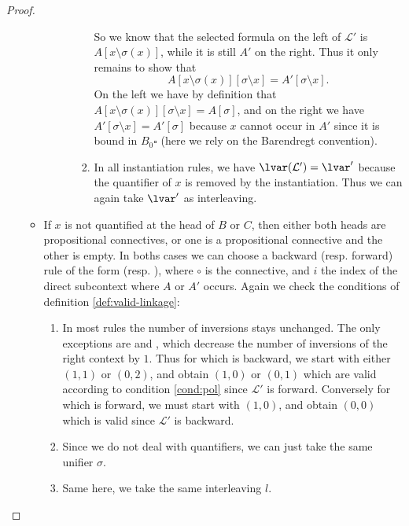 \begin{proof}
\begin{enumerate}
\begin{itemize}
\begin{description}
\begin{enumerate}
            So we know that the selected formula on the left of $\mathcal{L'}$
            is $A[x \setminus \sigma(x)]$, while it is still $A'$ on the right.
            Thus it only remains to show that
            $$A[x \setminus \sigma(x)][\sigma \setminus x] = A'[\sigma \setminus
            x].$$ On the left we have by definition that $A[x \setminus
            \sigma(x)][\sigma \setminus x] = A[\sigma]$, and on the right we
            have $A'[\sigma \setminus x] = A'[\sigma]$ because $x$ cannot occur
            in $A'$ since it is bound in $B_0\square$ (here we rely on the
            Barendregt convention).

            \item In all instantiation rules, we have $\lvar(\mathcal{L'}) =
            \lvar'$ because the quantifier of $x$ is removed by the
            instantiation. Thus we can again take $\lvar'$ as interleaving.
          \end{enumerate}
          
        \end{description}

      \item If $x$ is not quantified at the head of $B$ or $C$, then either both
      heads are propositional connectives, or one is a propositional connective
      and the other is empty. In boths cases we can choose a backward (resp.
      forward) rule of the form  (resp. ), where
      $\circ$ is the connective, and $i$ the index of the direct subcontext
      where $A$ or $A'$ occurs. Again we check the conditions of definition
      \ref{def:valid-linkage}:
      
      \begin{enumerate}
        \setlength{\itemsep}{0.8em}
        \renewcommand{\labelenumii}{\theenumii}
        \renewcommand{\theenumii}{\arabic{enumii}.}
            
        \item In most rules the number of inversions stays unchanged. The only
        exceptions are  and , which
        decrease the number of inversions of the right context by $1$. Thus for
         which is backward, we start with either $(1,1)$ or
        $(0,2)$, and obtain $(1,0)$ or $(0,1)$ which are valid according to
        condition \ref{cond:pol} since $\mathcal{L'}$ is forward. Conversely for
         which is forward, we must start with $(1,0)$, and
        obtain $(0,0)$ which is valid since $\mathcal{L'}$ is backward.

        \item Since we do not deal with quantifiers, we can just take the same
        unifier $\sigma$.

        \item Same here, we take the same interleaving $l$.
      \end{enumerate}
    \end{itemize} 
  \end{enumerate}
\end{proof}

